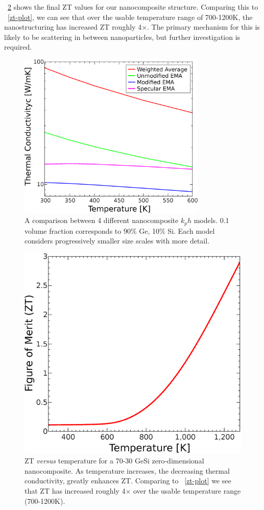 \documentclass[12pt]{article}
\newcommand{\figref}[2][\figurename~]{#1\ref{#2}}
\begin{document}
\figref{fig:zt-10nm} shows the final ZT values for our nanocomposite structure. Comparing this to \figref{zt-plot}, we can see that over the usable temperature range of 700-1200K, the nanostructuring has increased ZT roughly 4$\times$. The primary mechanism for this is likely to be scattering in between nanoparticles, but further investigation is required.

\begin{figure}
	\centering
	\includegraphics[width=0.8\textwidth]{mEMA-temp-10nm-log.eps}
	\caption{A comparison between 4 different nanocomposite $k_ph$ models. 0.1 volume fraction corresponds to 90\% Ge, 10\% Si. Each model considers progressively smaller size scales with more detail.}
	\label{fig:mEMA-temp-10nm-log}
\end{figure}

\begin{figure}
	\centering
	\includegraphics[width=\textwidth]{ZT-10nm.eps}
	\caption{ZT \emph{versus} temperature for a 70-30 GeSi zero-dimensional nanocomposite. As temperature increases, the decreasing thermal conductivity, greatly enhances ZT. Comparing to \figref{zt-plot} we see that ZT has increased roughly 4$\times$ over the usable temperature range (700-1200K).}
	\label{fig:zt-10nm}
\end{figure}
\end{document}
